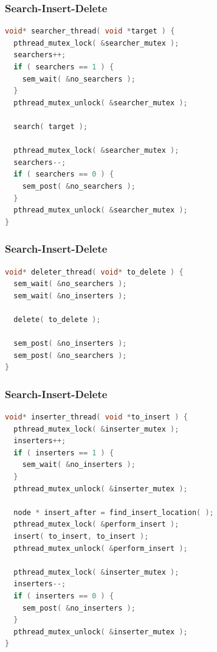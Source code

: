\begin{frame}[fragile]
\frametitle{Search-Insert-Delete}
\begin{lstlisting}[language=C]
void* searcher_thread( void *target ) {
  pthread_mutex_lock( &searcher_mutex );
  searchers++;
  if ( searchers == 1 ) {
    sem_wait( &no_searchers );
  }
  pthread_mutex_unlock( &searcher_mutex );
  
  search( target );
  
  pthread_mutex_lock( &searcher_mutex );
  searchers--;
  if ( searchers == 0 ) {
    sem_post( &no_searchers );
  }
  pthread_mutex_unlock( &searcher_mutex );
}
\end{lstlisting}
\end{frame}

\begin{frame}[fragile]
\frametitle{Search-Insert-Delete}
\begin{lstlisting}[language=C]
void* deleter_thread( void* to_delete ) {
  sem_wait( &no_searchers );
  sem_wait( &no_inserters );
  
  delete( to_delete );
  
  sem_post( &no_inserters );
  sem_post( &no_searchers );
}
\end{lstlisting}
\end{frame}

\begin{frame}[fragile]
\frametitle{Search-Insert-Delete}
\begin{lstlisting}[language=C]
void* inserter_thread( void *to_insert ) {
  pthread_mutex_lock( &inserter_mutex );
  inserters++;
  if ( inserters == 1 ) {
    sem_wait( &no_inserters );
  }
  pthread_mutex_unlock( &inserter_mutex );
  
  node * insert_after = find_insert_location( );
  pthread_mutex_lock( &perform_insert );
  insert( to_insert, to_insert );
  pthread_mutex_unlock( &perform_insert );
  
  pthread_mutex_lock( &inserter_mutex );
  inserters--;
  if ( inserters == 0 ) {
    sem_post( &no_inserters );
  }
  pthread_mutex_unlock( &inserter_mutex );
}
\end{lstlisting}
\end{frame}



